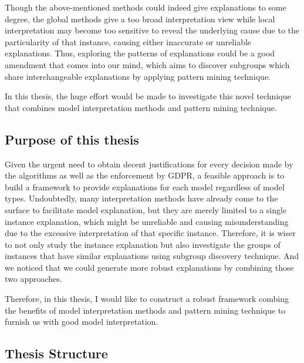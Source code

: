 Though the above-mentioned methods could indeed give explanations to some degree, the global methods give a too broad interpretation view while local interpretation may become too sensitive to reveal the underlying cause due to the particularity of that instance, causing either inaccurate or unreliable explanations. Thus, exploring the patterns of explanations could be a good amendment that comes into our mind, which aims to discover subgroups which share interchangeable explanations by applying pattern mining technique. 

In this thesis, the huge effort would be made to investigate this novel technique that combines model interpretation methods and pattern mining technique. 

\subsection{Purpose of this thesis}

Given the urgent need to obtain decent justifications for every decision made by the algorithms as well as the enforcement by GDPR, a feasible approach is to build a framework to provide explanations for each model regardless of model types. Undoubtedly, many interpretation methods have already come to the surface to facilitate model explanation, but they are merely limited to a single instance explanation, which might be unreliable and causing misunderstanding due to the excessive interpretation of that specific instance. Therefore, it is wiser to not only study the instance explanation but also investigate the groups of instances that have similar explanations using subgroup discovery technique. And we noticed that we could generate more robust explanations by combining those two approaches. 

Therefore, in this thesis, I would like to construct a robust framework combing the benefits of model interpretation methods and pattern mining technique to furnish us with good model interpretation. 


%
%	
%	
%	
%	
%	


\subsection{Thesis Structure}